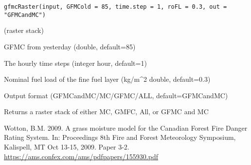 \documentclass[a4paper]{book}
\begin{document}
%
\begin{Usage}
\begin{verbatim}
gfmcRaster(input, GFMCold = 85, time.step = 1, roFL = 0.3, out = "GFMCandMC")
\end{verbatim}
\end{Usage}
%
\begin{Arguments}
\begin{ldescription}
\item[\code{input}] (raster stack)


\item[\code{GFMCold}] GFMC from yesterday (double, default=85)

\item[\code{time.step}] The hourly time steps (integer hour, default=1)

\item[\code{roFL}] Nominal fuel load of the fine fuel layer (kg/m\textasciicircum{}2 double, default=0.3)

\item[\code{out}] Output format (GFMCandMC/MC/GFMC/ALL, default=GFMCandMC)
\end{ldescription}
\end{Arguments}
%
\begin{Value}
Returns a raster stack of either MC, GMFC, All, or GFMC and MC
\end{Value}
%
\begin{References}\relax
Wotton, B.M. 2009. A grass moisture model for the Canadian
Forest Fire Danger Rating System. In: Proceedings 8th Fire and
Forest Meteorology Symposium, Kalispell, MT Oct 13-15, 2009.
Paper 3-2. \url{https://ams.confex.com/ams/pdfpapers/155930.pdf}
\end{References}
%
\end{document}
